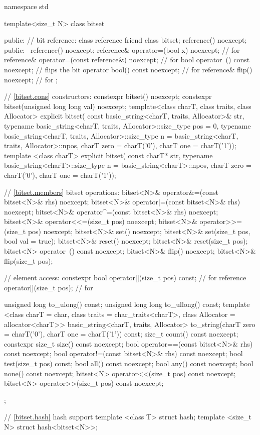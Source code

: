%
\begin{codeblock}
namespace std {
  template<size_t N> class bitset {
  public:
    // bit reference:
    class reference {
      friend class bitset;
      reference() noexcept;
    public:
     ~reference() noexcept;
      reference& operator=(bool x) noexcept;             // for 
      reference& operator=(const reference&) noexcept;   // for 
      bool operator~() const noexcept;                   // flips the bit
      operator bool() const noexcept;                    // for 
      reference& flip() noexcept;                        // for 
    };

    // \ref{bitset.cons} constructors:
    constexpr bitset() noexcept;
    constexpr bitset(unsigned long long val) noexcept;
    template<class charT, class traits, class Allocator>
      explicit bitset(
        const basic_string<charT, traits, Allocator>& str,
        typename basic_string<charT, traits, Allocator>::size_type pos = 0,
        typename basic_string<charT, traits, Allocator>::size_type n =
          basic_string<charT, traits, Allocator>::npos,
          charT zero = charT('0'), charT one = charT('1'));
    template <class charT>
      explicit bitset(
        const charT* str,
        typename basic_string<charT>::size_type n = basic_string<charT>::npos,
        charT zero = charT('0'), charT one = charT('1'));

    // \ref{bitset.members} bitset operations:
    bitset<N>& operator&=(const bitset<N>& rhs) noexcept;
    bitset<N>& operator|=(const bitset<N>& rhs) noexcept;
    bitset<N>& operator^=(const bitset<N>& rhs) noexcept;
    bitset<N>& operator<<=(size_t pos) noexcept;
    bitset<N>& operator>>=(size_t pos) noexcept;
    bitset<N>& set() noexcept;
    bitset<N>& set(size_t pos, bool val = true);
    bitset<N>& reset() noexcept;
    bitset<N>& reset(size_t pos);
    bitset<N>  operator~() const noexcept;
    bitset<N>& flip() noexcept;
    bitset<N>& flip(size_t pos);

    // element access:
    constexpr bool operator[](size_t pos) const;       // for 
    reference operator[](size_t pos);                  // for 

    unsigned long to_ulong() const;
    unsigned long long to_ullong() const;
    template <class charT = char,
        class traits = char_traits<charT>,
        class Allocator = allocator<charT>>
      basic_string<charT, traits, Allocator>
      to_string(charT zero = charT('0'), charT one = charT('1')) const;
    size_t count() const noexcept;
    constexpr size_t size() const noexcept;
    bool operator==(const bitset<N>& rhs) const noexcept;
    bool operator!=(const bitset<N>& rhs) const noexcept;
    bool test(size_t pos) const;
    bool all() const noexcept;
    bool any() const noexcept;
    bool none() const noexcept;
    bitset<N> operator<<(size_t pos) const noexcept;
    bitset<N> operator>>(size_t pos) const noexcept;
  };

  // \ref{bitset.hash} hash support
  template <class T> struct hash;
  template <size_t N> struct hash<bitset<N>>;
}
\end{codeblock}

